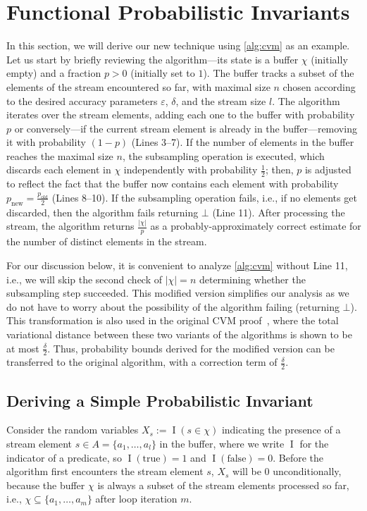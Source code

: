 \documentclass[a4paper,UKenglish,cleveref, autoref, thm-restate]{lipics-v2021}
\DeclareMathOperator{\indicat}{\mathrm{I}}
\begin{document}
\section{Functional Probabilistic Invariants}\label{sec:invariants}
In this section, we will derive our new technique using \cref{alg:cvm} as an example.
Let us start by briefly reviewing the algorithm---its state is a buffer $\chi$ (initially empty) and a fraction $p > 0$ (initially set to $1$).
The buffer tracks a subset of the elements of the stream encountered so far, with maximal size $n$ chosen according to the desired accuracy parameters $\varepsilon$, $\delta$, and the stream size $l$.
The algorithm iterates over the stream elements, adding each one to the buffer with probability $p$ or conversely---if the current stream element is already in the buffer---removing it with probability $(1-p)$ (Lines 3--7).
If the number of elements in the buffer reaches the maximal size $n$, the subsampling operation is executed, which discards each element in $\chi$ independently with probability $\frac{1}{2}$; then, $p$ is adjusted to reflect the fact that the buffer now contains each element with probability $p_\text{new} = \frac{p_\text{old}}{2}$ (Lines 8--10).
If the subsampling operation fails, i.e., if no elements get discarded, then the algorithm fails returning $\bot$ (Line 11).
After processing the stream, the algorithm returns $\frac{|\chi|}{p}$ as a probably-approximately correct estimate for the number of distinct elements in the stream.

\begin{remark}
For our discussion below, it is convenient to analyze \cref{alg:cvm} without Line 11, i.e., we will skip the second check of $|\chi|=n$ determining whether the subsampling step succeeded.
This modified version simplifies our analysis as we do not have to worry about the possibility of the algorithm failing (returning $\bot$).
This transformation is also used in the original CVM proof~\cite{chakraborty2023}, where the total variational distance between these two variants of the algorithms is shown to be at most $\frac{\delta}{2}$.
Thus, probability bounds derived for the modified version can be transferred to the original algorithm, with a correction term of $\frac{\delta}{2}$.
\lipicsEnd\end{remark}

\subsection{Deriving a Simple Probabilistic Invariant}
Consider the random variables $X_s := \indicat(s \in \chi)$ indicating the presence of a stream element $s \in A = \{a_1,\ldots,a_l\}$ in the buffer, where we write $\indicat$ for the indicator of a predicate, so $\indicat(\mathrm{true}) = 1$ and $\indicat(\mathrm{false}) = 0$.
Before the algorithm first encounters the stream element $s$, $X_s$ will be $0$ unconditionally, because the buffer $\chi$ is always a subset of the stream elements processed so far, i.e., $\chi \subseteq \{a_1,\dots,a_m\}$ after loop iteration $m$.
\end{document}
